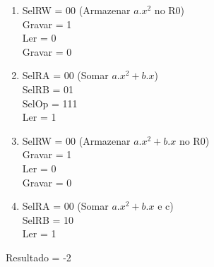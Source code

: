 \documentclass[]{article}
\begin{document}
\begin{enumerate}
			\item SelRW = 00 (Armazenar $a.x^2$ no R0)
			\\ Gravar = 1
			\\ Ler = 0 
			\\ Gravar = 0
			
			\item SelRA = 00 (Somar $a.x^2 + b.x$)
			\\ SelRB = 01
			\\ SelOp = 111
			\\ Ler = 1
			
			\item SelRW = 00 (Armazenar $a.x^2 + b.x$ no R0)
			\\ Gravar = 1
			\\ Ler = 0
			\\ Gravar = 0 
			
			\item SelRA = 00 (Somar $a.x^2 + b.x$ e c)
			\\ SelRB = 10
			\\ Ler = 1
			
		\end{enumerate}
		Resultado = -2
\end{document}
